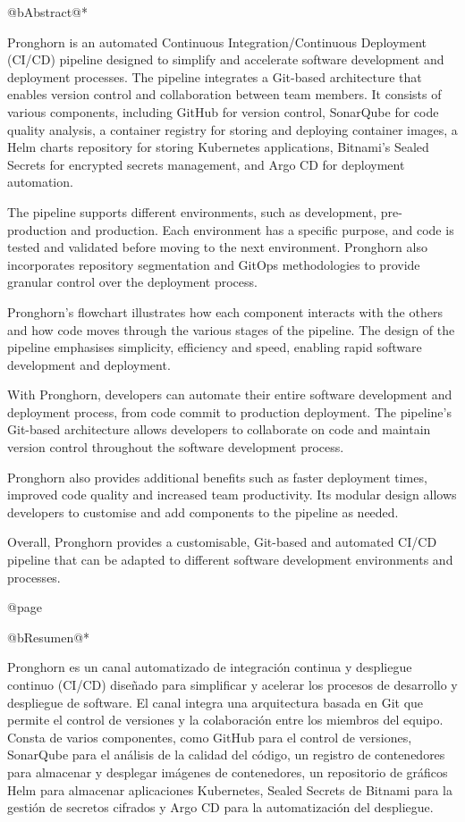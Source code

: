 @b{Abstract}@*

Pronghorn is an automated Continuous Integration/Continuous Deployment (CI/CD) pipeline designed to simplify and accelerate software development and deployment processes. The pipeline integrates a Git-based architecture that enables version control and collaboration between team members. It consists of various components, including GitHub for version control, SonarQube for code quality analysis, a container registry for storing and deploying container images, a Helm charts repository for storing Kubernetes applications, Bitnami's Sealed Secrets for encrypted secrets management, and Argo CD for deployment automation.

The pipeline supports different environments, such as development, pre-production and production. Each environment has a specific purpose, and code is tested and validated before moving to the next environment. Pronghorn also incorporates repository segmentation and GitOps methodologies to provide granular control over the deployment process.

Pronghorn's flowchart illustrates how each component interacts with the others and how code moves through the various stages of the pipeline. The design of the pipeline emphasises simplicity, efficiency and speed, enabling rapid software development and deployment.

With Pronghorn, developers can automate their entire software development and deployment process, from code commit to production deployment. The pipeline's Git-based architecture allows developers to collaborate on code and maintain version control throughout the software development process.

Pronghorn also provides additional benefits such as faster deployment times, improved code quality and increased team productivity. Its modular design allows developers to customise and add components to the pipeline as needed.

Overall, Pronghorn provides a customisable, Git-based and automated CI/CD pipeline that can be adapted to different software development environments and processes.

@page

@b{Resumen}@*

Pronghorn es un canal automatizado de integración continua y despliegue continuo (CI/CD) diseñado para simplificar y acelerar los procesos de desarrollo y despliegue de software. El canal integra una arquitectura basada en Git que permite el control de versiones y la colaboración entre los miembros del equipo. Consta de varios componentes, como GitHub para el control de versiones, SonarQube para el análisis de la calidad del código, un registro de contenedores para almacenar y desplegar imágenes de contenedores, un repositorio de gráficos Helm para almacenar aplicaciones Kubernetes, Sealed Secrets de Bitnami para la gestión de secretos cifrados y Argo CD para la automatización del despliegue.

